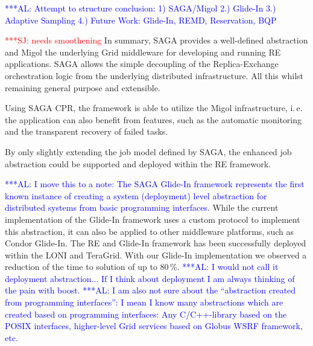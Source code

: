 \documentclass{rspublic}
\newcommand{\alnote}[1]{ {\textcolor{blue} { ***AL: #1 }}}
\newcommand{\jhanote}[1]{ {\textcolor{red} { ***SJ: #1 }}}
\newcommand{\alnote}[1]{}
\newcommand{\jhanote}[1]{}
\newcommand{\glidein}[1]{Glide-In }
\begin{document}
{%

                    
\alnote{Attempt to structure conclusion:
1) SAGA/Migol 2.) Glide-In 3.) Adaptive Sampling 4.) Future Work: Glide-In, REMD, Reservation, BQP}
                                         
\jhanote{needs smoothening} In summary, SAGA provides a well-defined abstraction 
and Migol the underlying Grid middleware for developing and running
RE applications.
SAGA allows the simple decoupling of the Replica-Exchange orchestration 
logic from the underlying distributed infrastructure. All this whilst remaining
general purpose and extensible. 

Using SAGA CPR, the framework is able to utilize the Migol infrastructure, 
i.\,e. the application can 
also benefit from features, such as the automatic monitoring and the transparent 
recovery of failed tasks.  

By only slightly extending the job model defined by SAGA, the enhanced job
abstraction could be supported and deployed within the RE framework.  


\alnote{I move this to a note:
The SAGA \glidein\ framework represents the first known instance of creating a
system (deployment) level abstraction for distributed systems from
basic programming interfaces.} 
While the current implementation of the Glide-In framework uses 
a custom protocol to implement this abstraction, it can also be applied 
to other middleware platforms, such as Condor Glide-In. The RE and 
Glide-In framework has been successfully deployed within 
the LONI and TeraGrid. With our Glide-In implementation we observed 
a reduction of the time to solution of up to 80\,\%.  
\alnote{I would not call it deployment abstraction... If I think about
deployment I am always thinking of the pain with boost.}
\alnote{I am also not sure about the ``abstraction created from 
  programming interfaces'': 
  I mean I know many abstractions which are created based on
  programming interfaces: Any C/C++-library based on the POSIX
  interfaces, higher-level Grid services based on Globus WSRF
  framework, etc.}   

}
\end{document}
